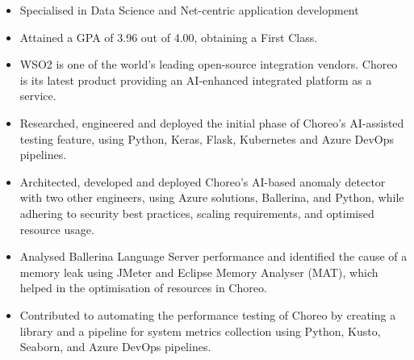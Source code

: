 \documentclass[10pt,a4paper,ragged2e,withhyper]{altacv}
\begin{document}
\divider{}

\begin{itemize}
    \item Specialised in Data Science and Net-centric application development
    \item Attained a GPA of 3.96 out of 4.00, obtaining a First Class.
\end{itemize}

\medskip


\begin{itemize}
    \item WSO2 is one of the world's leading open-source integration vendors. Choreo is its latest product providing an AI-enhanced integrated platform as a service. 
    \item Researched, engineered and deployed the initial phase of Choreo's AI-assisted testing feature, using Python, Keras, Flask, Kubernetes and Azure DevOps pipelines.
    \item Architected, developed and deployed Choreo’s AI-based anomaly detector with two other engineers, using Azure solutions, Ballerina, and Python, while adhering to security best practices, scaling requirements, and optimised resource usage.
    \item Analysed Ballerina Language Server performance and identified the cause of a memory leak using JMeter and Eclipse Memory Analyser (MAT), which helped in the optimisation of resources in Choreo.
    \item Contributed to automating the performance testing of Choreo by creating a library and a pipeline for system metrics collection using Python, Kusto, Seaborn, and Azure DevOps pipelines.
\end{itemize}

\divider{}
\end{document}
